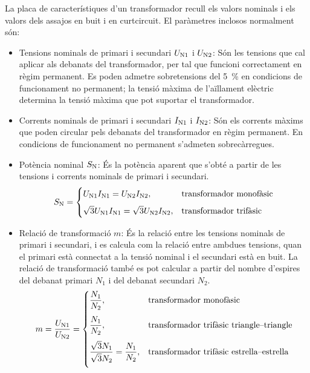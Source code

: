 La  placa de característiques d'un transformador recull els valors nominals  i els valors dels assajos
en buit i en curtcircuit. El paràmetres inclosos normalment són:
\begin{itemize}
   \item Tensions nominals de primari i secundari  $U_\mathrm{N1}$ i $U_\mathrm{N2}$: Són les tensions que cal aplicar als debanats del transformador, per tal que funcioni correctament en règim permanent. Es poden admetre sobretensions del \SI{5}{\percent} en condicions de funcionament no permanent; la tensió màxima de l'aïllament elèctric determina la tensió màxima que pot suportar el transformador.
   \item Corrents nominals de primari i secundari  $I_\mathrm{N1}$ i $I_\mathrm{N2}$: Són els corrents màxims que poden circular pels debanats del transformador en règim permanent. En condicions de funcionament no permanent s'admeten sobrecàrregues.
   \item Potència nominal $S_\mathrm{N}$: És la potència aparent que s'obté a partir de les tensions i corrents nominals de primari i secundari.
       \begin{equation}
        S_\mathrm{N} = \begin{cases} U_\mathrm{N1} I_\mathrm{N1} = U_\mathrm{N2} I_\mathrm{N2}, & \text{transformador monofàsic} \\[2mm]
        \sqrt{3} U_\mathrm{N1} I_\mathrm{N1} = \sqrt{3} U_\mathrm{N2} I_\mathrm{N2}, & \text{transformador trifàsic} \end{cases}
       \end{equation}
   \item Relació de transformació $m$: És la relació entre les tensions nominals de primari i secundari, i es calcula com la relació entre ambdues tensions, quan el primari està connectat a la tensió nominal i el secundari està en buit. La relació de  transformació també es pot calcular a partir del nombre d'espires del debanat primari $N_1$ i del debanat secundari $N_2$.
       \begin{equation}
        m = \frac{U_\mathrm{N1}}{U_\mathrm{N2}} =  \begin{cases}
        \dfrac{N_1}{N_2}, & \text{transformador monofàsic} \\[0.4cm]
        \dfrac{N_1}{N_2}, & \text{transformador trifàsic triangle--triangle} \\[0.4cm]
        \dfrac{\sqrt{3}N_1}{\sqrt{3}N_2} = \dfrac{N_1}{N_2}, & \text{transformador trifàsic estrella--estrella} \\[0.4cm]

\end{cases}
\end{equation}
\end{itemize}
